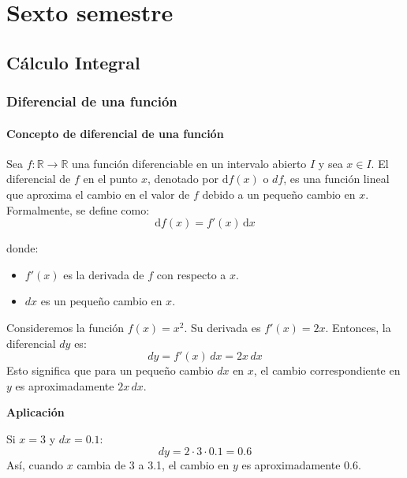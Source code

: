 \part{Sexto semestre}
\chapter{Cálculo Integral}

\section{Diferencial de una función} %
\subsection{Concepto de diferencial de una función}
\begin{definition}
    Sea $f: \mathbb{R} \rightarrow \mathbb{R}$ una función diferenciable en un intervalo abierto $I$ y sea $x \in I$. El diferencial de $f$ en el punto $x$, denotado por $\mathrm{d}f(x)$ o $df$, es una función lineal que aproxima el cambio en el valor de $f$ debido a un pequeño cambio en $x$. Formalmente, se define como:
\begin{equation}
    \mathrm{d}f(x) = f'(x) \, \mathrm{d}x
\end{equation}
\begin{notation}
donde:
    \begin{itemize}
        \item $f'(x)$ es la derivada de \( f \) con respecto a \( x \).
        \item $dx$ es un pequeño cambio en \( x \).
    \end{itemize}
\end{notation}
\end{definition}
\begin{example}
    Consideremos la función \( f(x) = x^2 \). Su derivada es \( f'(x) = 2x \). Entonces, la diferencial \( dy \) es:
    \begin{equation}
        dy = f'(x) \, dx = 2x \, dx
    \end{equation}
    Esto significa que para un pequeño cambio \( dx \) en \( x \), el cambio correspondiente en \( y \) es aproximadamente \( 2x \, dx \).
    
    \textbf{Aplicación}
    
    Si \( x = 3 \) y \( dx = 0.1 \):
\begin{equation*}
    dy = 2 \cdot 3 \cdot 0.1 = 0.6
\end{equation*}
    Así, cuando \( x \) cambia de 3 a 3.1, el cambio en \( y \) es aproximadamente 0.6.
\end{example}
\newpage
